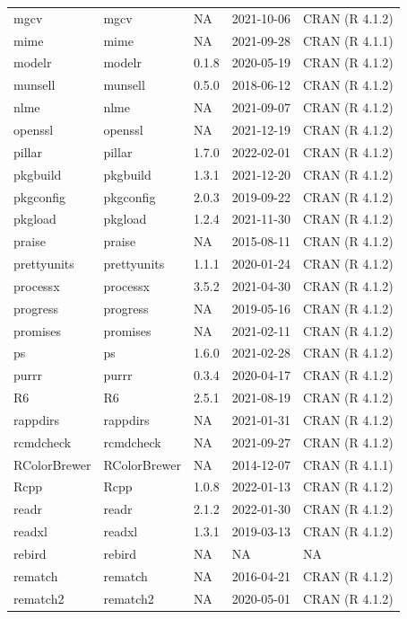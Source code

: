 \begin{tabular}{lllll}
\addlinespace
mgcv & mgcv & NA & 2021-10-06 & CRAN (R 4.1.2)\\
mime & mime & NA & 2021-09-28 & CRAN (R 4.1.1)\\
modelr & modelr & 0.1.8 & 2020-05-19 & CRAN (R 4.1.2)\\
munsell & munsell & 0.5.0 & 2018-06-12 & CRAN (R 4.1.2)\\
nlme & nlme & NA & 2021-09-07 & CRAN (R 4.1.2)\\
\addlinespace
openssl & openssl & NA & 2021-12-19 & CRAN (R 4.1.2)\\
pillar & pillar & 1.7.0 & 2022-02-01 & CRAN (R 4.1.2)\\
pkgbuild & pkgbuild & 1.3.1 & 2021-12-20 & CRAN (R 4.1.2)\\
pkgconfig & pkgconfig & 2.0.3 & 2019-09-22 & CRAN (R 4.1.2)\\
pkgload & pkgload & 1.2.4 & 2021-11-30 & CRAN (R 4.1.2)\\
\addlinespace
praise & praise & NA & 2015-08-11 & CRAN (R 4.1.2)\\
prettyunits & prettyunits & 1.1.1 & 2020-01-24 & CRAN (R 4.1.2)\\
processx & processx & 3.5.2 & 2021-04-30 & CRAN (R 4.1.2)\\
progress & progress & NA & 2019-05-16 & CRAN (R 4.1.2)\\
promises & promises & NA & 2021-02-11 & CRAN (R 4.1.2)\\
\addlinespace
ps & ps & 1.6.0 & 2021-02-28 & CRAN (R 4.1.2)\\
purrr & purrr & 0.3.4 & 2020-04-17 & CRAN (R 4.1.2)\\
R6 & R6 & 2.5.1 & 2021-08-19 & CRAN (R 4.1.2)\\
rappdirs & rappdirs & NA & 2021-01-31 & CRAN (R 4.1.2)\\
rcmdcheck & rcmdcheck & NA & 2021-09-27 & CRAN (R 4.1.2)\\
\addlinespace
RColorBrewer & RColorBrewer & NA & 2014-12-07 & CRAN (R 4.1.1)\\
Rcpp & Rcpp & 1.0.8 & 2022-01-13 & CRAN (R 4.1.2)\\
readr & readr & 2.1.2 & 2022-01-30 & CRAN (R 4.1.2)\\
readxl & readxl & 1.3.1 & 2019-03-13 & CRAN (R 4.1.2)\\
rebird & rebird & NA & NA & NA\\
\addlinespace
rematch & rematch & NA & 2016-04-21 & CRAN (R 4.1.2)\\
rematch2 & rematch2 & NA & 2020-05-01 & CRAN (R 4.1.2)\\

\end{tabular}
